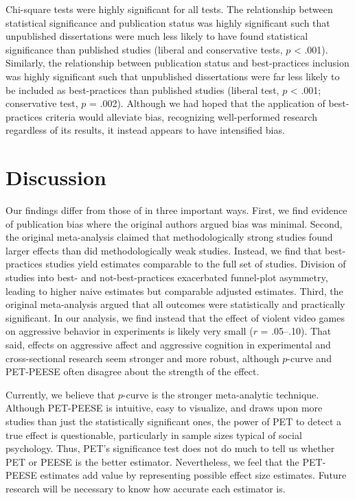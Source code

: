\documentclass[man]{apa6}
\begin{document}
Chi-square tests were highly significant for all tests. The relationship between statistical significance and publication status was highly significant such that unpublished dissertations were much less likely to have found statistical significance than published studies (liberal and conservative tests, $p$ < .001).
Similarly, the relationship between publication status and best-practices inclusion was highly significant such that unpublished dissertations were far less likely to be included as best-practices than published studies (liberal test, $p$ < .001; conservative test, $p$ = .002).
Although we had hoped that the application of best-practices criteria would alleviate bias, recognizing well-performed research regardless of its results, it instead appears to have intensified bias. 

\section{Discussion}
Our findings differ from those of \citet{Anderson:etal:2010} in three important ways. First, we find evidence of publication bias where the original authors argued bias was minimal. Second, the original meta-analysis claimed that methodologically strong studies found larger effects than did methodologically weak studies. Instead, we find that best-practices studies yield estimates comparable to the full set of studies. Division of studies into best- and not-best-practices exacerbated funnel-plot asymmetry, leading to higher naive estimates but comparable adjusted estimates. Third, the original meta-analysis argued that all outcomes were statistically and practically significant. In our analysis, we find instead that the effect of violent video games on aggressive behavior in experiments is likely very small ($r$ = .05--.10). That said, effects on aggressive affect and aggressive cognition in experimental and cross-sectional research seem stronger and more robust, although $p$-curve and PET-PEESE often disagree about the strength of the effect.

Currently, we believe that $p$-curve is the stronger meta-analytic technique. Although PET-PEESE is intuitive, easy to visualize, and draws upon more studies than just the statistically significant ones, the power of PET to detect a true effect is questionable, particularly in sample sizes typical of social psychology. Thus, PET's significance test does not do much to tell us whether PET or PEESE is the better estimator. Nevertheless, we feel that the PET-PEESE estimates add value by representing possible effect size estimates. Future research will be necessary to know how accurate each estimator is.
\end{document}
